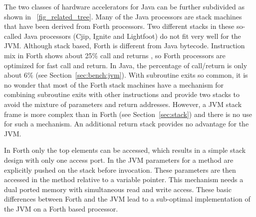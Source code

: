 The two classes of hardware accelerators for Java can be further
subdivided as shown in \figurename~\ref{fig_related_tree}. Many of
the Java processors are stack machines that have been derived from
Forth processors. Two different stacks in these so-called Java
processors (Cjip, Ignite and Lightfoot) do not fit very well for the
JVM. Although stack based, Forth is different from Java bytecode.
Instruction mix in Forth shows about 25\% call and returns
\cite{Koopman89}, so Forth processors are optimized for fast call
and return. In Java, the percentage of call/return is only about 6\%
(see Section~\ref{sec:bench:jvm}). With subroutine exits so common,
it is no wonder that most of the Forth stack machines have a
mechanism for combining subroutine exits with other instructions and
provide two stacks to avoid the mixture of parameters and return
addresses. However, a JVM stack frame is more complex than in Forth
(see Section~\ref{sec:stack}) and there is no use for such a
mechanism. An additional return stack provides no advantage for the
JVM.

In Forth only the top elements can be accessed, which results in a
simple stack design with only one access port. In the JVM parameters
for a method are explicitly pushed on the stack before invocation.
These parameters are then accessed in the method relative to a
variable pointer. This mechanism needs a dual ported memory with
simultaneous read and write access. These basic differences between
Forth and the JVM lead to a sub-optimal implementation of the JVM on
a Forth based processor.

